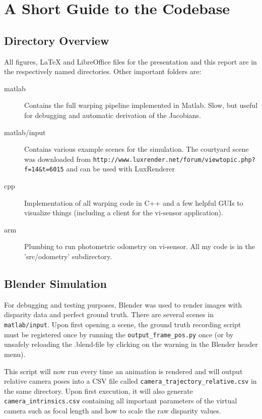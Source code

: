 \chapter{A Short Guide to the Codebase}
\label{sec:usage}

\section{Directory Overview}

All figures, LaTeX and LibreOffice files for the presentation and this report
are in the respectively named directories. Other important folders are:

\begin{description}
    \item[matlab]
        Contains the full warping pipeline implemented in Matlab. Slow, but useful for debugging and automatic derivation of the Jacobians.
    \item[matlab/input]
        Contains various example scenes for the simulation.
        The courtyard scene was downloaded from \texttt{http://www.luxrender.net/forum/viewtopic.php?f=14\&t=6015} and can be used with LuxRenderer
    \item[cpp] Implementation of all warping code in C++ and a few helpful GUIs to visualize things (including a client for the vi-sensor application).
    \item[arm] Plumbing to run photometric odometry on vi-sensor. All my code is in the 'src/odometry' subdirectory.
\end{description}


\section{Blender Simulation}

For debugging and testing purposes, Blender was used to render images with
disparity data and perfect ground truth.  There are several scenes in
\texttt{matlab/input}. Upon first opening a scene, the ground truth
recording script must be registered once by running the
\texttt{output\_frame\_pos.py} once (or by unsafely reloading the .blend-file by
clicking on the warning in the Blender header menu).

This script will now run every time an animation is rendered and will output
relative camera poses into a CSV file called
\texttt{camera\_trajectory\_relative.csv} in the same directory. Upon first
execution, it will also generate \texttt{camera\_intrinsics.csv} containing all
important parameters of the virtual camera such as focal length and how to
scale the raw disparity values.

